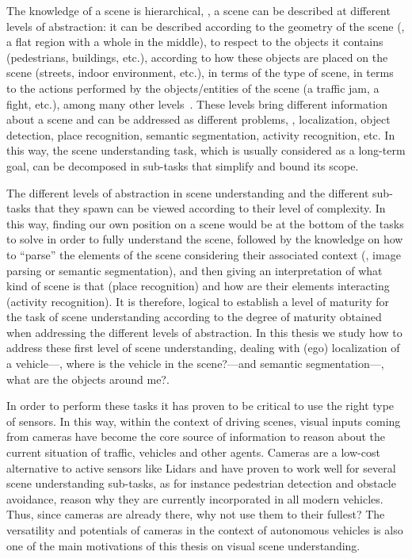 The knowledge of a scene is hierarchical, \ie, a scene can be described at different levels of abstraction: it can be described according to the geometry of the scene (\eg, a flat region with a whole in the middle), to respect to the objects it contains (\eg pedestrians, buildings, etc.), according to how these objects are placed on the scene (\eg streets, indoor environment, etc.), in terms of the type of scene, in terms to the actions performed by the objects/entities of the scene (\eg a traffic jam, a fight, etc.), among many other levels~\cite{SceneUnderstanding}. These levels bring different information about a scene and can be addressed as different problems, \eg, localization, object detection, place recognition, semantic segmentation, activity recognition, etc. In this way, the scene understanding task, which is usually considered as a long-term goal, can be decomposed in sub-tasks that simplify and bound its scope.

The different levels of abstraction in scene understanding and the different sub-tasks that they spawn can be viewed according to their level of complexity. In this way, finding our own position on a scene would be at the bottom of the tasks to solve in order to fully understand the scene, followed by the knowledge on how to ``parse'' the elements of the scene considering their associated context (\ie, image parsing or semantic segmentation), and then giving an interpretation of what kind of scene is that (place recognition) and how are their elements interacting (activity recognition). It is therefore, logical to establish a level of maturity for the task of scene understanding according to the degree of maturity obtained when addressing the different levels of abstraction. In this thesis we study how to address these first level of scene understanding, dealing with (ego) localization of a vehicle---\ie, where is the vehicle in the scene?---and semantic segmentation---\ie, what are the objects around me?.

In order to perform these tasks it has proven to be critical to use the right type of sensors. In this way, within the context of driving scenes, visual inputs coming from cameras have become the core source of information to reason about the current situation of traffic, vehicles and other agents. Cameras are a low-cost alternative to active sensors like Lidars and have proven to work well for several scene understanding sub-tasks, as for instance pedestrian detection and obstacle avoidance, reason why they are currently incorporated in all modern vehicles. Thus, since cameras are already there, why not use them to their fullest? The versatility and potentials of cameras in the context of autonomous vehicles is also one of the main motivations of this thesis on visual scene understanding.

